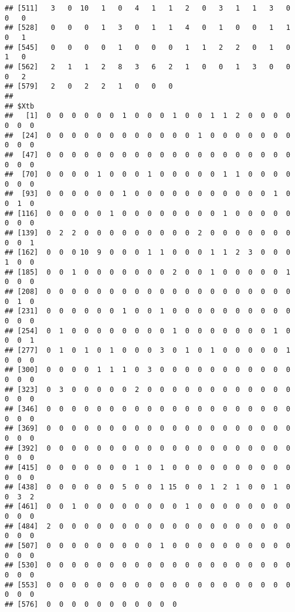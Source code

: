 \documentclass[]{article}
\begin{document}
\begin{verbatim}
## [511]   3   0  10   1   0   4   1   1   2   0   3   1   1   3   0   0   0
## [528]   0   0   0   1   3   0   1   1   4   0   1   0   0   1   1   0   1
## [545]   0   0   0   0   1   0   0   0   1   1   2   2   0   1   0   1   0
## [562]   2   1   1   2   8   3   6   2   1   0   0   1   3   0   0   0   2
## [579]   2   0   2   2   1   0   0   0
## 
## $Xtb
##   [1]  0  0  0  0  0  0  1  0  0  0  1  0  0  1  1  2  0  0  0  0  0  0  0
##  [24]  0  0  0  0  0  0  0  0  0  0  0  0  1  0  0  0  0  0  0  0  0  0  0
##  [47]  0  0  0  0  0  0  0  0  0  0  0  0  0  0  0  0  0  0  0  0  0  0  0
##  [70]  0  0  0  0  1  0  0  0  1  0  0  0  0  0  1  1  0  0  0  0  0  0  0
##  [93]  0  0  0  0  0  0  1  0  0  0  0  0  0  0  0  0  0  0  1  0  0  1  0
## [116]  0  0  0  0  0  1  0  0  0  0  0  0  0  0  1  0  0  0  0  0  0  0  0
## [139]  0  2  2  0  0  0  0  0  0  0  0  0  2  0  0  0  0  0  0  0  0  0  1
## [162]  0  0  0 10  9  0  0  0  1  1  0  0  0  1  1  2  3  0  0  0  1  0  0
## [185]  0  0  1  0  0  0  0  0  0  0  2  0  0  1  0  0  0  0  0  1  0  0  0
## [208]  0  0  0  0  0  0  0  0  0  0  0  0  0  0  0  0  0  0  0  0  0  1  0
## [231]  0  0  0  0  0  0  1  0  0  1  0  0  0  0  0  0  0  0  0  0  0  0  0
## [254]  0  1  0  0  0  0  0  0  0  0  1  0  0  0  0  0  0  0  1  0  0  0  1
## [277]  0  1  0  1  0  1  0  0  0  3  0  1  0  1  0  0  0  0  0  1  0  0  0
## [300]  0  0  0  0  1  1  1  0  3  0  0  0  0  0  0  0  0  0  0  0  0  0  0
## [323]  0  3  0  0  0  0  0  2  0  0  0  0  0  0  0  0  0  0  0  0  0  0  0
## [346]  0  0  0  0  0  0  0  0  0  0  0  0  0  0  0  0  0  0  0  0  0  0  0
## [369]  0  0  0  0  0  0  0  0  0  0  0  0  0  0  0  0  0  0  0  0  0  0  0
## [392]  0  0  0  0  0  0  0  0  0  0  0  0  0  0  0  0  0  0  0  0  0  0  0
## [415]  0  0  0  0  0  0  0  1  0  1  0  0  0  0  0  0  0  0  0  0  0  0  0
## [438]  0  0  0  0  0  0  5  0  0  1 15  0  0  1  2  1  0  0  1  0  0  3  2
## [461]  0  0  1  0  0  0  0  0  0  0  0  1  0  0  0  0  0  0  0  0  0  0  0
## [484]  2  0  0  0  0  0  0  0  0  0  0  0  0  0  0  0  0  0  0  0  0  0  0
## [507]  0  0  0  0  0  0  0  0  0  1  0  0  0  0  0  0  0  0  0  0  0  0  0
## [530]  0  0  0  0  0  0  0  0  0  0  0  0  0  0  0  0  0  0  0  0  0  0  0
## [553]  0  0  0  0  0  0  0  0  0  0  0  0  0  0  0  0  0  0  0  0  0  0  0
## [576]  0  0  0  0  0  0  0  0  0  0  0
\end{verbatim}
\end{document}
